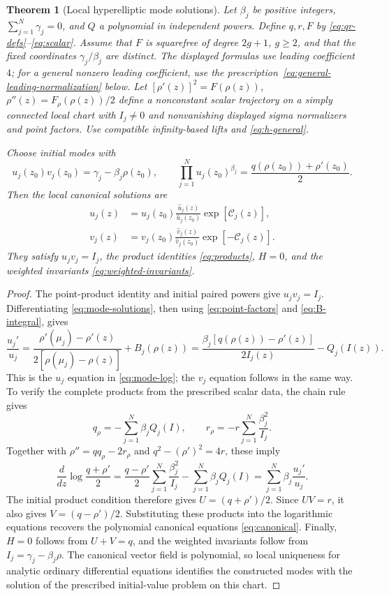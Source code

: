 \documentclass[11pt]{article}
\newtheorem{theorem}{Theorem}[section]
\begin{document}
\begin{theorem}[Local hyperelliptic mode solutions]\label{thm:mode-solutions}
Let $\beta_j$ be positive integers, $\sum_{j=1}^{N}\gamma_j=0$, and $Q$ a polynomial in independent powers. Define $q,r,F$ by \eqref{eq:qr-defs}--\eqref{eq:scalar}. Assume that $F$ is squarefree of degree $2g+1$, $g\ge2$, and that the fixed coordinates $\gamma_j/\beta_j$ are distinct. The displayed formulas use leading coefficient $4$; for a general nonzero leading coefficient, use the prescription~\eqref{eq:general-leading-normalization} below. Let $[\rho'(z)]^2=F(\rho(z))$, $\rho''(z)=F_\rho(\rho(z))/2$ define a nonconstant scalar trajectory on a simply connected local chart with $I_j\ne0$ and nonvanishing displayed sigma normalizers and point factors. Use compatible infinity-based lifts and \eqref{eq:h-general}.

Choose initial modes with
\[
u_j(z_0)v_j(z_0)=\gamma_j-\beta_j\rho(z_0),\qquad
\prod_{j=1}^{N} u_j(z_0)^{\beta_j}=\frac{q(\rho(z_0))+\rho'(z_0)}2.
\]
Then the local canonical solutions are
\begin{equation}\label{eq:mode-solutions}
\begin{aligned}
u_j(z)&=u_j(z_0)\frac{\widehat u_j(z)}{\widehat u_j(z_0)}
\exp\!\left[\mathcal C_j(z)\right],\\
v_j(z)&=v_j(z_0)\frac{\widehat v_j(z)}{\widehat v_j(z_0)}
\exp\!\left[-\mathcal C_j(z)\right].
\end{aligned}
\end{equation}
They satisfy $u_jv_j=I_j$, the product identities \eqref{eq:products}, $H=0$, and the weighted invariants \eqref{eq:weighted-invariants}.
\end{theorem}

\begin{proof}
The point-product identity and initial paired powers give $u_jv_j=I_j$. Differentiating \eqref{eq:mode-solutions}, then using \eqref{eq:point-factors} and \eqref{eq:B-integral}, gives
\[
\frac{u_j'}{u_j}
=\frac{\rho'(\mu_j)-\rho'(z)}{2[\rho(\mu_j)-\rho(z)]}+B_j(\rho(z))
=\frac{\beta_j[q(\rho(z))-\rho'(z)]}{2I_j(z)}-Q_j(I(z)).
\]
This is the $u_j$ equation in \eqref{eq:mode-log}; the $v_j$ equation follows in the same way. To verify the complete products from the prescribed scalar data, the chain rule gives
\[
q_\rho=-\sum_{j=1}^{N}\beta_jQ_j(I),\qquad
r_\rho=-r\sum_{j=1}^{N}\frac{\beta_j^2}{I_j}.
\]
Together with $\rho''=qq_\rho-2r_\rho$ and $q^2-(\rho')^2=4r$, these imply
\[
\frac{d}{dz}\log\frac{q+\rho'}2
=\frac{q-\rho'}2\sum_{j=1}^{N}\frac{\beta_j^2}{I_j}
-\sum_{j=1}^{N}\beta_jQ_j(I)
=\sum_{j=1}^{N}\beta_j\frac{u_j'}{u_j}.
\]
The initial product condition therefore gives $U=(q+\rho')/2$. Since $UV=r$, it also gives $V=(q-\rho')/2$. Substituting these products into the logarithmic equations recovers the polynomial canonical equations \eqref{eq:canonical}. Finally, $H=0$ follows from $U+V=q$, and the weighted invariants follow from $I_j=\gamma_j-\beta_j\rho$. The canonical vector field is polynomial, so local uniqueness for analytic ordinary differential equations identifies the constructed modes with the solution of the prescribed initial-value problem on this chart.
\end{proof}
\end{document}
